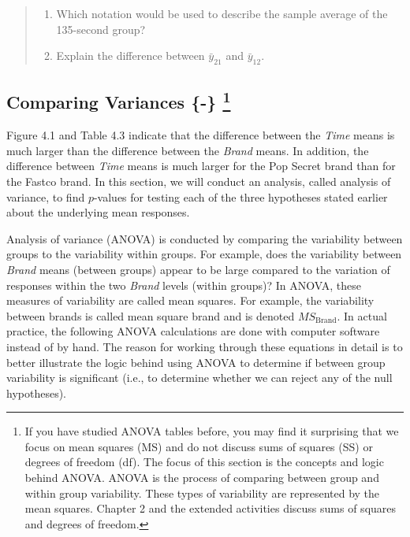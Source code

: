 \documentclass[
]{book}
\providecommand{\tightlist}{%
  \setlength{\itemsep}{0pt}\setlength{\parskip}{0pt}}
\begin{document}
\begin{quote}
\begin{enumerate}
\def\labelenumi{\arabic{enumi}.}
\setcounter{enumi}{5}
\tightlist
\item
  Which notation would be used to describe the sample average of the 135-second group?\\
\item
  Explain the difference between \(\bar{y}_{21}\) and \(\bar{y}_{12}\).
\end{enumerate}
\end{quote}

\hypertarget{comparing-variances--}{%
\subsection[Comparing Variances \{-\} ]{\texorpdfstring{Comparing Variances \{-\} \footnote{If you have studied ANOVA tables before, you may find it surprising that we focus on mean squares (MS) and do not discuss sums of squares (SS) or degrees of freedom (df). The focus of this section is the concepts and logic behind ANOVA. ANOVA is the process of comparing between group and within group variability. These types of variability are represented by the mean squares. Chapter 2 and the extended activities discuss sums of squares and degrees of freedom.}}{Comparing Variances \{-\} }}\label{comparing-variances--}}

Figure 4.1 and Table 4.3 indicate that the difference between the \emph{Time} means is much larger than the difference between the \emph{Brand} means. In addition, the difference between \emph{Time} means is much larger for the Pop Secret brand than for the Fastco brand. In this section, we will conduct an analysis, called analysis of variance, to find \(p\)-values for testing each of the three hypotheses stated earlier about the underlying mean responses.

Analysis of variance (ANOVA) is conducted by comparing the variability between groups to the variability within groups. For example, does the variability between \emph{Brand} means (between groups) appear to be large compared to the variation of responses within the two \emph{Brand} levels (within groups)? In ANOVA, these measures of variability are called mean squares. For example, the variability between brands is called mean square brand and is denoted \(MS_{\text{Brand}}\). In actual practice, the following ANOVA calculations are done with computer software instead of by hand. The reason for working through these equations in detail is to better illustrate the logic behind using ANOVA to determine if between group variability is significant (i.e., to determine whether we can reject any of the null hypotheses).
\end{document}
